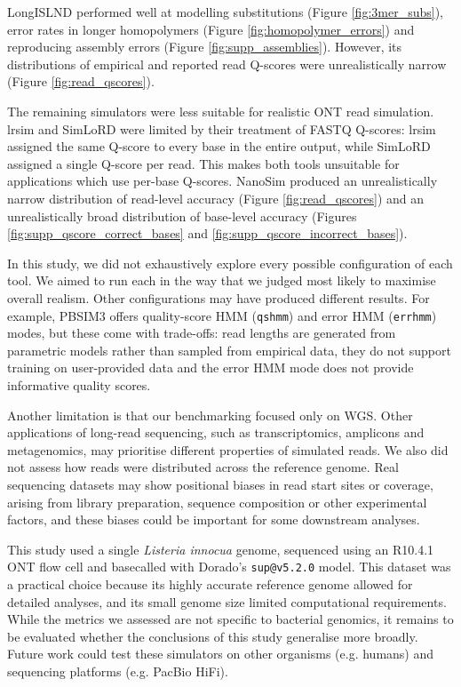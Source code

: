 \documentclass[webpdf,modern,large]{biorxiv}
\begin{document}
LongISLND performed well at modelling substitutions (Figure \ref{fig:3mer_subs}), error rates in longer homopolymers (Figure \ref{fig:homopolymer_errors}) and reproducing assembly errors (Figure \ref{fig:supp_assemblies}). However, its distributions of empirical and reported read Q-scores were unrealistically narrow (Figure \ref{fig:read_qscores}).

The remaining simulators were less suitable for realistic ONT read simulation. lrsim and SimLoRD were limited by their treatment of FASTQ Q-scores: lrsim assigned the same Q-score to every base in the entire output, while SimLoRD assigned a single Q-score per read. This makes both tools unsuitable for applications which use per-base Q-scores. NanoSim produced an unrealistically narrow distribution of read-level accuracy (Figure \ref{fig:read_qscores}) and an unrealistically broad distribution of base-level accuracy (Figures \ref{fig:supp_qscore_correct_bases} and \ref{fig:supp_qscore_incorrect_bases}).

In this study, we did not exhaustively explore every possible configuration of each tool. We aimed to run each in the way that we judged most likely to maximise overall realism. Other configurations may have produced different results. For example, PBSIM3 offers quality-score HMM (\texttt{qshmm}) and error HMM (\texttt{errhmm}) modes, but these come with trade-offs: read lengths are generated from parametric models rather than sampled from empirical data, they do not support training on user-provided data and the error HMM mode does not provide informative quality scores.

Another limitation is that our benchmarking focused only on WGS. Other applications of long-read sequencing, such as transcriptomics, amplicons and metagenomics, may prioritise different properties of simulated reads. We also did not assess how reads were distributed across the reference genome. Real sequencing datasets may show positional biases in read start sites or coverage, arising from library preparation, sequence composition or other experimental factors, and these biases could be important for some downstream analyses.

This study used a single \textit{Listeria innocua} genome, sequenced using an R10.4.1 ONT flow cell and basecalled with Dorado's \texttt{sup@v5.2.0} model. This dataset was a practical choice because its highly accurate reference genome allowed for detailed analyses, and its small genome size limited computational requirements. While the metrics we assessed are not specific to bacterial genomics, it remains to be evaluated whether the conclusions of this study generalise more broadly. Future work could test these simulators on other organisms (e.g. humans) and sequencing platforms (e.g. PacBio HiFi).
\end{document}
